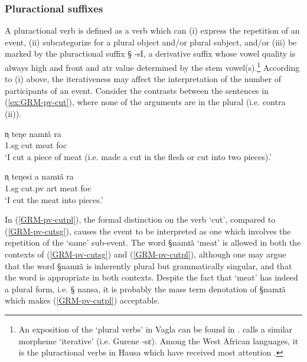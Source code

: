 \subsubsection{Pluractional suffixes}
\label{sec:GRM-PluralVerb}


A pluractional verb is defined as a verb which can (i) express the repetition of
an event,  (ii)   subcategorize for a plural object and/or  plural subject,
and/or  (iii)  be marked by the pluractional suffix {\S
-sI}, a derivative suffix whose  vowel quality is always high and
front
and  {\sc atr} value determined by the stem vowel(s).\footnote{An exposition of
the
`plural verbs' in Vagla can be found in \cite{Blen03}. \citet[viii]{Daku07}
calls a similar morpheme `iterative' (i.e. Gurene {\F -sɛ}).  Among the West
African
languages, it is the pluractional verbs in Hausa which have received most
attention \citep[see][]{Jose08}.}  According to (i) above, the iterativeness may
affect the interpretation of the number of participants of an event. Consider
the contrasts between the 
sentences in (\ref{ex:GRM-pv-cut}), where none of the arguments are in the
plural (i.e. contra (ii)).


\begin{exe}
\ex\label{ex:GRM-pv-cut}
  \begin{xlist}
    \ex\label{GRM-pv-cutsg}
\gll   n̩  teŋe  namɪã  ra  \\
       {\sc 1.sg} {cut} {meat} {\sc foc}\\
\glt `I cut a piece of meat (i.e.  made a cut in the flesh or cut into two
pieces).'

\ex\label{GRM-pv-cutpl}
\gll    n̩    teŋesi  a  namɪã  ra \\
          {\sc 1.sg} {cut.{\sc pv}} {\sc art} {meat} {\sc foc}\\
\glt `I cut the meat into pieces.'

 \end{xlist}
\end{exe}

In  (\ref{GRM-pv-cutpl}),  the formal distinction on the verb `cut',  compared
to (\ref{GRM-pv-cutsg}),  causes  the event to be interpreted as one which
involves the repetition of the `same'  sub-event.  The word {\S namɪã} `meat'
is allowed in both the contexts of (\ref{GRM-pv-cutsg}) and
(\ref{GRM-pv-cutpl}), although one may argue that the word {\S namɪã} is
inherently
plural but grammatically singular,  and that the word is appropriate in both
contexts. Despite the fact that  `meat' has indeed a plural form, i.e. {\S
nansa}, it is probably the mass term denotation of {\S namɪã} which 
makes (\ref{GRM-pv-cutpl}) acceptable.

